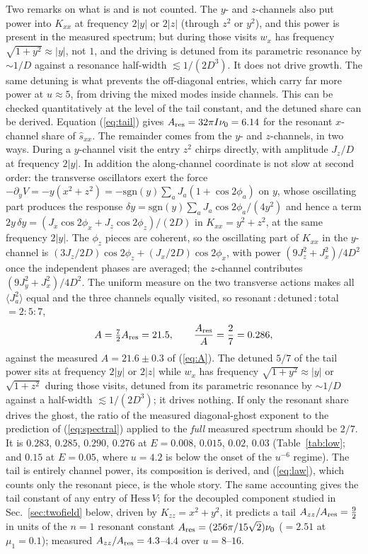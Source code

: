 \documentclass[11pt,a4paper]{article}
\newcommand{\Hess}{\mathrm{Hess}\,}
\begin{document}
Two remarks on what is and is not counted. The $y$- and $z$-channels also put power into
$K_{xx}$ at frequency $2|y|$ or $2|z|$ (through $z^2$ or $y^2$), and this power is present in the
measured spectrum; but during those visits $w_x$ has frequency $\sqrt{1+y^2}\approx|y|$, not $1$,
and the driving is detuned from its parametric resonance by $\sim1/D$ against a resonance
half-width $\lesssim1/(2D^3)$. It does not drive growth. The same detuning is what prevents the
off-diagonal entries, which carry far more power at $u\approx5$, from driving the mixed modes
inside channels. This can be checked quantitatively at the level of the tail constant, and the detuned share can
be derived. Equation (\ref{eq:tail}) gives $A_{\rm res}=32\pi I\nu_0=6.14$ for the resonant
$x$-channel share of $\hat s_{xx}$. The remainder comes from the $y$- and $z$-channels, in two
ways. During a $y$-channel visit the entry $z^2$ chirps directly, with amplitude $J_z/D$ at
frequency $2|y|$. In addition the along-channel coordinate is not slow at second order: the
transverse oscillators exert the force $-\partial_yV=-y(x^2+z^2)=-\mathrm{sgn}(y)\sum_a
J_a(1+\cos2\phi_a)$ on $y$, whose oscillating part produces the response
$\delta y=\mathrm{sgn}(y)\sum_aJ_a\cos2\phi_a/(4y^2)$ and hence a term
$2y\,\delta y=(J_x\cos2\phi_x+J_z\cos2\phi_z)/(2D)$ in $K_{xx}=y^2+z^2$, at the same frequency
$2|y|$. The $\phi_z$ pieces are coherent, so the oscillating part of $K_{xx}$ in the $y$-channel
is $(3J_z/2D)\cos2\phi_z+(J_x/2D)\cos2\phi_x$, with power $(9J_z^2+J_x^2)/4D^2$ once the
independent phases are averaged; the $z$-channel contributes $(9J_y^2+J_x^2)/4D^2$. The uniform
measure on the two transverse actions makes all $\langle J_a^2\rangle$ equal and the three
channels equally visited, so resonant\,:\,detuned\,:\,total $=2:5:7$,
\begin{equation}
A=\tfrac72A_{\rm res}=21.5,\qquad \frac{A_{\rm res}}{A}=\frac27=0.286,
\label{eq:seven}
\end{equation}
against the measured $A=21.6\pm0.3$ of (\ref{eq:A}). The detuned $5/7$ of the tail power sits at
frequency $2|y|$ or $2|z|$ while $w_x$ has frequency $\sqrt{1+y^2}\approx|y|$ or $\sqrt{1+z^2}$
during those visits, detuned from its parametric resonance by $\sim1/D$ against a half-width
$\lesssim1/(2D^3)$; it drives nothing. If only the resonant share drives the ghost, the ratio of
the measured diagonal-ghost exponent to the prediction of (\ref{eq:spectral}) applied to the
\emph{full} measured spectrum should be $2/7$. It is $0.283$, $0.285$, $0.290$, $0.276$ at
$E=0.008$, $0.015$, $0.02$, $0.03$ (Table~\ref{tab:low}; and $0.15$ at $E=0.05$, where $u=4.2$ is
below the onset of the $u^{-6}$ regime). The tail is entirely channel power, its composition is
derived, and (\ref{eq:law}), which counts only the resonant piece, is the whole story. The same
accounting gives the tail constant of any entry of $\Hess V$; for the decoupled component studied
in Sec.~\ref{sec:twofield} below, driven by $K_{zz}=x^2+y^2$, it predicts a tail
$A_{zz}/A_{\rm res}=\tfrac92$ in units of the $n=1$ resonant constant
$A_{\rm res}=(256\pi/15\sqrt2)\nu_0$ ($=2.51$ at $\mu_1=0.1$); measured $A_{zz}/A_{\rm res}=4.3$--$4.4$
over $u=8$--$16$.
\end{document}
